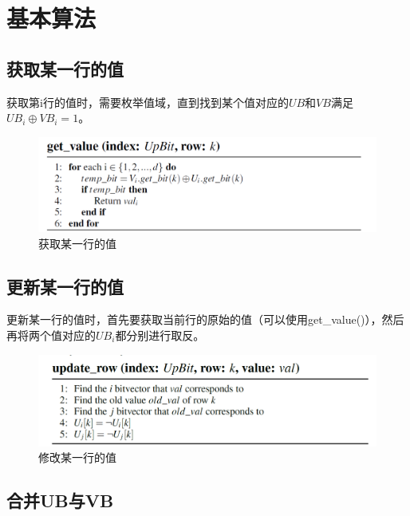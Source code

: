 \documentclass[11pt, a4paper]{article}
\begin{document}
  \section{基本算法}

  \subsection{获取某一行的值}

  获取第i行的值时，需要枚举值域，直到找到某个值对应的$UB$和$VB$满足$UB_i \oplus VB_i = 1$。

  \begin{figure}[H]
    \begin{center}
      \includegraphics[width=5in]{get_value.png}
      \caption{获取某一行的值}
      \label{fig:get_value}
    \end{center}
  \end{figure}

  \subsection{更新某一行的值}

  更新某一行的值时，首先要获取当前行的原始的值（可以使用get\_value()），然后再将两个值对应的$UB_i$都分别进行取反。


  \begin{figure}[H]
    \begin{center}
      \includegraphics[width=5in]{update_row.png}
      \caption{修改某一行的值}
      \label{fig:update_row}
    \end{center}
  \end{figure}

  \subsection{合并UB与VB}
\end{document}
